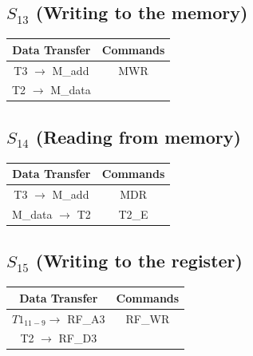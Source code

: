 \documentclass[]{report}
\begin{document}
        \subsection*{$S_{13}$ (Writing to the memory)} %
        \begin{center}
            \begin{tabular}{|c|c|}
                \hline
                Data Transfer & Commands \\
                \hline
                T3 $\to$ M\_add & MWR\\
                T2 $\to$ M\_data & \\
                \hline
            \end{tabular}
        \end{center}
        \subsection*{$S_{14}$ (Reading from memory)} %
        \begin{center}
            \begin{tabular}{|c|c|}
                \hline
                Data Transfer & Commands \\
                \hline
                T3 $\to$ M\_add & MDR\\
                M\_data $\to$ T2 & T2\_E\\
                \hline
            \end{tabular}
        \end{center}
        \subsection*{$S_{15}$ (Writing to the register)} %
            \begin{center}
                \begin{tabular}{|c|c|}
                    \hline
                    Data Transfer & Commands \\
                    \hline
                    $T1_{11-9} \to$ RF\_A3 & RF\_WR\\
                    T2 $\to$ RF\_D3 & \\
                    \hline
                \end{tabular}
            \end{center}
\end{document}
